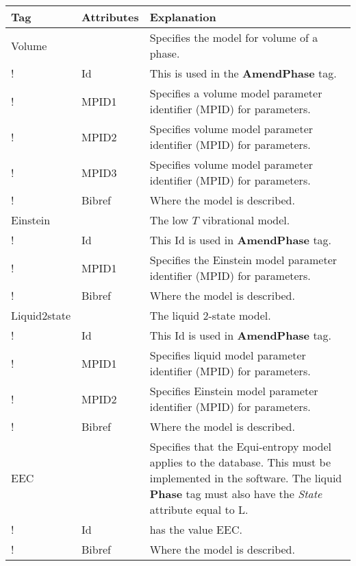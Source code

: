 \documentclass{article}
\begin{document}
\bigskip
\begin{tabular}{|p{} p{} p{}|}\hline
  Tag & Attributes & Explanation\\\hline

    Volume & & Specifies the model for volume of a phase.\\
!      & Id & This is used in the {\bf AmendPhase} tag.\\
!      & MPID1 & Specifies a volume model parameter identifier
                    (MPID) for parameters.\\
!      & MPID2 & Specifies volume model parameter identifier
                    (MPID) for parameters.\\
!      & MPID3 & Specifies volume model parameter identifier
                    (MPID) for parameters.\\
!      & Bibref & Where the model is described.\\\hline

  Einstein & & The low $T$ vibrational model.\\
!      & Id & This Id is used in {\bf AmendPhase} tag.\\
!      & MPID1 & Specifies the Einstein model parameter identifier (MPID)
          for parameters.\\
!      & Bibref & Where the model is described.\\\hline

  Liquid2state & & The liquid 2-state model.\\
!      & Id & This Id is used in {\bf AmendPhase} tag.\\
!      & MPID1 & Specifies liquid model parameter identifier (MPID)
         for parameters.\\
!      & MPID2 & Specifies Einstein model parameter identifier (MPID)
         for parameters.\\
!      & Bibref & Where the model is described.\\\hline

  EEC & & Specifies that the Equi-entropy model applies to the database.
          This must be implemented in the software.  The liquid 
         {\bf Phase} tag must also have the {\em State} attribute equal to L. \\
!      & Id     & has the value EEC.\\
!      & Bibref & Where the model is described.\\\hline

\end{tabular}
\end{document}
